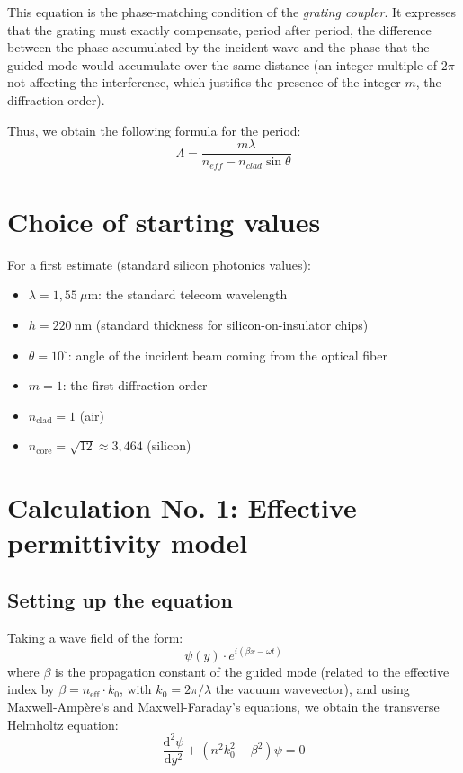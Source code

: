 \documentclass[a4paper,11pt]{report}
\begin{document}
This equation is the phase-matching condition of the \textit{grating coupler}. It expresses that the grating must exactly compensate, period after period, the difference between the phase accumulated by the incident wave and the phase that the guided mode would accumulate over the same distance (an integer multiple of $2\pi$ not affecting the interference, which justifies the presence of the integer $m$, the diffraction order).

Thus, we obtain the following formula for the period:
\begin{equation}
\boxed{\Lambda = \frac{m\lambda}{n_{eff} - n_{clad}\sin\theta}}
\label{eq:lambda_theorique}
\end{equation}

\section{Choice of starting values}
For a first estimate (standard silicon photonics values):
\begin{itemize}
    \item $\lambda = 1{,}55~\mu\text{m}$: the standard telecom wavelength 
    \item $h = 220 ~\text{nm}$ (standard thickness for silicon-on-insulator chips)
    \item $\theta = 10^\circ$: angle of the incident beam coming from the optical fiber
    \item $m = 1$: the first diffraction order
    \item $n_{\text{clad}} = 1$ (air)
    \item $n_{\text{core}} = \sqrt{12} \approx 3{,}464$ (silicon)

\end{itemize}

\section{Calculation No. 1: Effective permittivity model}
\label{sec:calcul_neff}

\subsection*{Setting up the equation}

Taking a wave field of the form:
\begin{equation}
\psi(y) \cdot e^{i (\beta x - \omega t)}
\end{equation}
where $\beta$ is the propagation constant of the guided mode (related to the effective index by $\beta=n_{\text{eff}}\cdot k_0$, with $k_0=2\pi/\lambda$ the vacuum wavevector), and using Maxwell-Ampère's and Maxwell-Faraday's equations, we obtain the transverse Helmholtz equation:
\begin{equation}
\frac{\text{d}^2\psi}{\text{d}y^2} + (n^2 k_0^2 - \beta^2) \psi = 0
\end{equation}
\end{document}
